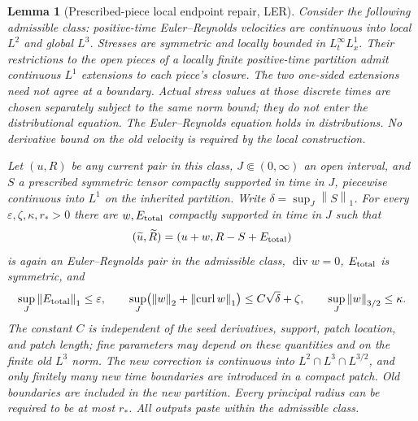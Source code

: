 \documentclass[11pt]{article}
\newtheorem{lemma}[theorem]{Lemma}
\theoremstyle{remark}\newtheorem{remark}[theorem]{Remark}
\newcommand{\curl}{\operatorname{curl}}
\newcommand{\Div}{\operatorname{div}}
\newcommand{\norm}[2]{\left\|#1\right\|_{#2}}
\begin{document}
\begin{lemma}[Prescribed-piece local endpoint repair, LER]\label{ass:LER}
Consider the following admissible class: positive-time Euler--Reynolds
velocities are continuous into local $L^2$ and global $L^3$.
Stresses are symmetric and locally bounded in $L^\infty_tL^1_x$.
Their restrictions to the open pieces of a locally finite positive-time
partition admit continuous $L^1$ extensions to each piece's closure.
The two one-sided extensions need not agree at a boundary.
Actual stress values at those discrete times are chosen separately subject
to the same norm bound; they do not enter the distributional equation.
The Euler--Reynolds equation holds in distributions. No derivative bound
on the old velocity is required by the local construction.

Let $(u,R)$ be any current pair in this class, $J\Subset(0,\infty)$ an
open interval, and $S$ a prescribed symmetric tensor compactly supported in
time in $J$, piecewise continuous into $L^1$ on the inherited partition.
Write $\delta=\sup_J\norm S1$.
For every $\varepsilon,\zeta,\kappa,r_*>0$
there are $w,E_{\rm total}$ compactly supported in time in $J$ such that
\[
 (\widetilde u,\widetilde R)=(u+w,R-S+E_{\rm total})
\]
is again an Euler--Reynolds pair in the admissible class,
$\Div w=0$, $E_{\rm total}$ is symmetric, and
\[
 \sup_J\norm{E_{\rm total}}1\leq\varepsilon,\qquad
 \sup_J\bigl(\norm w2+\norm{\curl w}1\bigr)\leq C\sqrt\delta+\zeta,
 \qquad \sup_J\norm w{3/2}\leq\kappa.
\]
The constant $C$ is independent of the seed derivatives, support, patch
location, and patch length; fine parameters may depend on these quantities
and on the finite old $L^3$ norm. The new correction is continuous into
$L^2\cap L^3\cap L^{3/2}$, and only finitely many new time boundaries are
introduced in a compact patch. Old boundaries are included in the new
partition.
Every principal radius can be required to be at most $r_*$.
All outputs paste within the admissible class.
\end{lemma}
\end{document}

